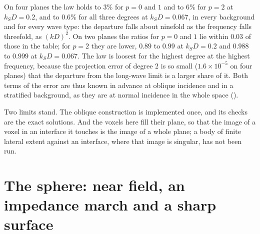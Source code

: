 \documentclass[preprint,review,12pt]{elsarticle}
\begin{document}
On four planes the law holds to $3\%$ for $p=0$ and $1$ and to $6\%$ for $p=2$ at $k_SD=0.2$, and to
$0.6\%$ for all three degrees at $k_SD=0.067$, in every background and for every wave type: the
departure falls about ninefold as the frequency falls threefold, as $(kD)^2$. On two planes the ratios
for $p=0$ and $1$ lie within $0.03$ of those in the table; for $p=2$ they are lower, $0.89$ to $0.99$ at
$k_SD=0.2$ and $0.988$ to $0.999$ at $k_SD=0.067$. The law is loosest for the highest degree at the
highest frequency, because the projection error of degree $2$ is so small ($1.6\times10^{-5}$ on four
planes) that the departure from the long-wave limit is a larger share of it. Both terms of
the error are thus known in advance at oblique incidence and in a stratified background, as they are
at normal incidence in the whole space ().

Two limits stand. The oblique construction is implemented once, and its checks are the exact
solutions. And the voxels here fill their plane, so that the image of a voxel in an interface it
touches is the image of a whole plane; a body of finite lateral extent against an interface, where
that image is singular, has not been run.

\FloatBarrier

\section{The sphere: near field, an impedance march and a sharp surface}\label{app:sphere}
\end{document}
